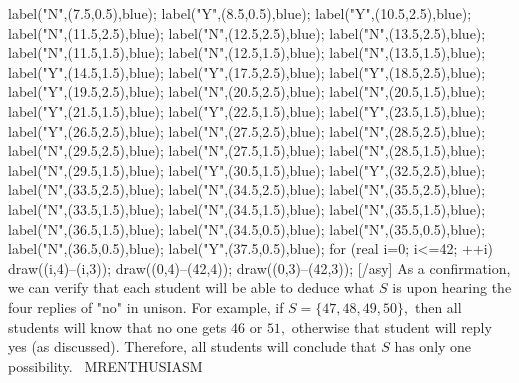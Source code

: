 \documentclass[12pt]{article}
\begin{document}
label("N",(7.5,0.5),blue); label("Y",(8.5,0.5),blue); label("Y",(10.5,2.5),blue); label("N",(11.5,2.5),blue); label("N",(12.5,2.5),blue); label("N",(13.5,2.5),blue); label("N",(11.5,1.5),blue); label("N",(12.5,1.5),blue); label("N",(13.5,1.5),blue); label("Y",(14.5,1.5),blue); label("Y",(17.5,2.5),blue); label("Y",(18.5,2.5),blue); label("Y",(19.5,2.5),blue); label("N",(20.5,2.5),blue); label("N",(20.5,1.5),blue); label("Y",(21.5,1.5),blue); label("Y",(22.5,1.5),blue); label("Y",(23.5,1.5),blue); label("Y",(26.5,2.5),blue); label("N",(27.5,2.5),blue); label("N",(28.5,2.5),blue); label("N",(29.5,2.5),blue); label("N",(27.5,1.5),blue); label("N",(28.5,1.5),blue); label("N",(29.5,1.5),blue); label("Y",(30.5,1.5),blue); label("Y",(32.5,2.5),blue); label("N",(33.5,2.5),blue); label("N",(34.5,2.5),blue); label("N",(35.5,2.5),blue); label("N",(33.5,1.5),blue); label("N",(34.5,1.5),blue); label("N",(35.5,1.5),blue); label("N",(36.5,1.5),blue); label("N",(34.5,0.5),blue); label("N",(35.5,0.5),blue); label("N",(36.5,0.5),blue); label("Y",(37.5,0.5),blue); for (real i=0; i<=42; ++i) { draw((i,4)--(i,3)); } draw((0,4)--(42,4)); draw((0,3)--(42,3)); [/asy] As a confirmation, we can verify that each student will be able to deduce what $S$ is upon hearing the four replies of "no" in unison. For example, if $S=\{47,48,49,50\},$ then all students will know that no one gets $46$ or $51,$ otherwise that student will reply yes (as discussed). Therefore, all students will conclude that $S$ has only one possibility. ~MRENTHUSIASM
\end{document}
